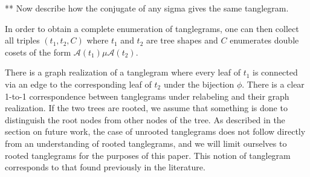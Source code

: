 \documentclass{amsart}
\newcommand{\fS}{\mathfrak S}
\newcommand{\aut}{\mathcal A}
\newcommand{\pairing}{\mu}
\newcommand{\id}{\iota}
\begin{document}
** Now describe how the conjugate of any sigma gives the same tanglegram.


In order to obtain a complete enumeration of tanglegrams, one can then collect all triples $(t_1, t_2, C)$ where $t_1$ and $t_2$ are tree shapes and $C$ enumerates double cosets of the form $\aut(t_1) \pairing \aut(t_2)$.

%

There is a graph realization of a tanglegram where every leaf of $t_1$ is connected via an edge to the corresponding leaf of $t_2$ under the bijection $\phi$.
There is a clear 1-to-1 correspondence between tanglegrams under relabeling and their graph realization.
If the two trees are rooted, we assume that something is done to distinguish the root nodes from other nodes of the tree.
As described in the section on future work, the case of unrooted tanglegrams does not follow directly from an understanding of rooted tanglegrams, and we will limit ourselves to rooted tanglegrams for the purposes of this paper.
This notion of tanglegram corresponds to that found previously in the literature.
\end{document}
